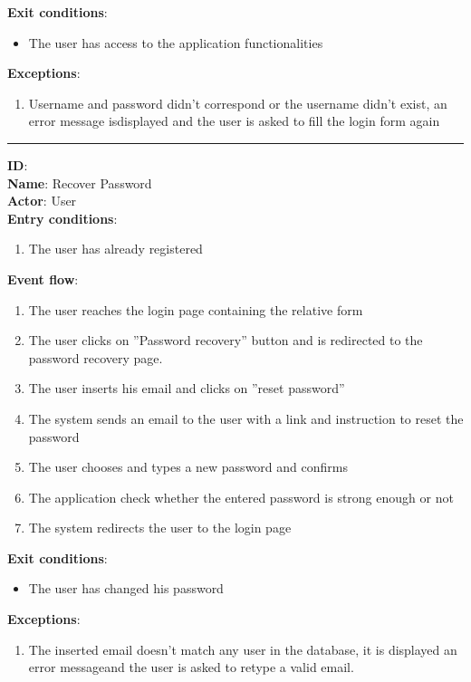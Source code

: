 	\textbf{Exit conditions}:
	\begin{itemize}
		\item{The user has access to the application functionalities}
	\end{itemize}
	\textbf{Exceptions}:
	\begin{enumerate}
    		\item{Username and password didn’t correspond or the username didn’t exist, an error message isdisplayed and the user is asked to ﬁll the login form again}
 	   \end{enumerate}
	\rule{\linewidth}{0.4pt}
	\textbf{ID}:   \\
	\textbf{Name}: Recover Password \\
	\textbf{Actor}: User \\
	\textbf{Entry conditions}:
	\begin{enumerate}
		\item{The user has already registered}
	\end{enumerate}
	\textbf{Event flow}:
	\begin{enumerate}
		\item{The user reaches the login page containing the relative form}
		\item{The user clicks on ”Password recovery” button and is redirected to the password recovery page.}
		\item{The user inserts his email and clicks on ”reset password”}
		\item{The system sends an email to the user with a link and instruction to reset the password}
		\item{The user chooses and types a new password and conﬁrms}
		\item{The application check whether the entered password is strong enough or not}
		\item{The system redirects the user to the login page}
	\end{enumerate}
	\textbf{Exit conditions}:
	\begin{itemize}
		\item{The user has changed his password}
	\end{itemize}
	\textbf{Exceptions}:
	\begin{enumerate}
    		\item{The inserted email doesn't match any user in the database, it is displayed an error messageand the user is asked to retype a valid email.}
 	   \end{enumerate}
